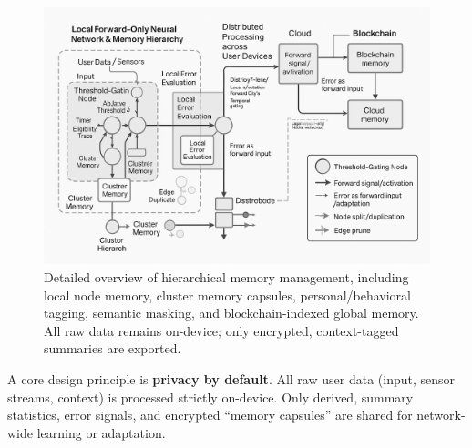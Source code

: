 \documentclass[11pt]{article}
\begin{document}
\begin{figure}[ht]
    \centering
    \includegraphics[width=0.63\linewidth]{architecture_diagrams/bbe6c593-355f-42f7-a0a1-79f3937b8efa.png}
    \caption{
        Detailed overview of hierarchical memory management, including local node memory, cluster memory capsules, personal/behavioral tagging, semantic masking, and blockchain-indexed global memory. All raw data remains on-device; only encrypted, context-tagged summaries are exported.
    }
    \label{fig:overview-mem-management}
\end{figure}

A core design principle is \textbf{privacy by default}. All raw user data (input, sensor streams, context) is processed strictly on-device. Only derived, summary statistics, error signals, and encrypted “memory capsules” are shared for network-wide learning or adaptation.
\end{document}
